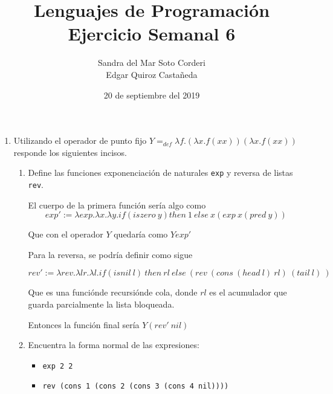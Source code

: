 \documentclass{article}
\begin{document}
    \title{
        Lenguajes de Programación \\
        Ejercicio Semanal 6
    }

    \author{
        Sandra del Mar Soto Corderi \\
        Edgar Quiroz Castañeda
    }

    \date{
        20 de septiembre del 2019
    }
    
    \maketitle

    \begin{enumerate}
        \item {
            Utilizando el operador de punto fijo 
            $Y =_{def} \lambda f.(\lambda x.f(xx))(\lambda x.f(xx))$ responde 
            los siguientes incisos.
            
            \begin{enumerate}
           
            	\item {
                    Define las funciones exponenciación de naturales \texttt{exp}
                    y reversa de listas \texttt{rev}.
                    
                    El cuerpo de la primera función sería algo como
                    \[
                        exp' := \lambda exp. \lambda x. \lambda y. 
                        if (iszero \ y) then \ 1 \ else \ x (exp \ x (pred \ y))
                    \]

                    Que con el operador $Y$ quedaría como $Y exp'$

                    Para la reversa, se podría definir como sigue

                     \[
                         rev ' := \lambda rev. \lambda lr. \lambda l.
                         if (isnil \ l) \ then \ rl \ else \ (rev \ (cons \ (head \ l) \ rl)
                         \ (tail \ l) \ 
                         )
                     \]

                    Que es una funciónde recursiónde cola, donde $rl$ es el
                    acumulador que guarda parcialmente la lista bloqueada.

                    Entonces la función final sería $Y(rev ' \ nil)$
        		
        		}
        	
        	\item {
        		Encuentra la forma normal de las expresiones:
        		
        		\begin{itemize}
        			\item {
        			 \texttt{exp 2 2}
        			 
        			}
        		
        			\item {
        			\texttt{rev (cons 1 (cons 2 (cons 3 (cons 4 nil))))}
        			}
        		\end{itemize}
    		}
    	 \end{enumerate}
        }
    \end{enumerate}
\end{document}
